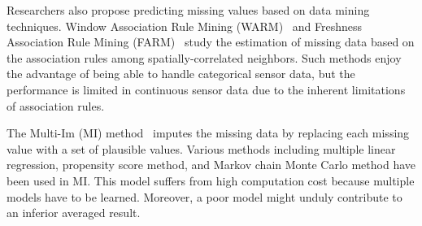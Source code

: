 Researchers also propose predicting missing values based on data mining techniques. Window Association Rule Mining (WARM)~\cite{le2005estimating} and Freshness Association Rule Mining (FARM)~\cite{Gruenwald:FARM} study the estimation of missing data based on the association rules among spatially-correlated neighbors. 
Such methods enjoy the advantage of being able to handle categorical sensor data, but the performance is limited in continuous sensor data due to the inherent limitations of association rules.

The Multi-Im (MI) method~\cite{yuan2000multiple} imputes the missing data by replacing each missing value with a set of plausible values.
Various methods including multiple linear regression, propensity score method, and Markov chain Monte Carlo method have been used in MI.%
This model suffers from high computation cost because multiple models have to be learned. Moreover, a poor model might unduly 
contribute to an inferior averaged result. 

